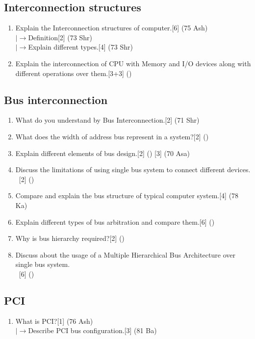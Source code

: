 \documentclass[12pt]{article}
\newcommand{\lb}{\\$\left|\rightarrow\right.$}
\newcommand{\enter}{\\\textcolor{white}{1}}
\begin{document}
	\subsection{Interconnection structures}
	\begin{enumerate}[noitemsep, topsep = 0pt]
	\item Explain the Interconnection structures of computer.\hfill[6] (75 Ash)\
	\lb Definition\hfill[2] (73 Shr)
	\lb Explain different types.\hfill[4] (73 Shr)
	\item Explain the interconnection of CPU with Memory and I/O devices along with different operations over them.\hfill[3+3] ()
	\end{enumerate}
	\subsection{Bus interconnection}
	\begin{enumerate}[noitemsep, topsep = 0pt]
	\item What do you understand by Bus Interconnection.\hfill[2] (71 Shr)
	\item What does the width of address bus represent in a system?\hfill[2] ()
	\item Explain different elements of bus design.\hfill[2] (\bo{\texttt{79 Bh}}) [3] (70 Asa)
	\item Discuss the limitations of using single bus system to connect different devices.
	\enter\hfill[2] (\bo{75 Ch, 72 Ch})
	\item Compare and explain the bus structure of typical computer system.\hfill[4] (78 Ka)
	\item Explain different types of bus arbitration and compare them.\hfill[6] ()
	\item Why is bus hierarchy required?\hfill[2] (\bo{71 Ch})
	\item Discuss about the usage of a Multiple Hierarchical Bus Architecture over single bus system.
	\enter\hfill[6] (\bo{\texttt{80 Bh}})
	\end{enumerate}
	\subsection{PCI}
	\begin{enumerate}[noitemsep, topsep = 0pt]
	\item What is PCI?\hfill[1] (76 Ash)
	\lb Describe PCI bus configuration.\hfill[3] (81 Ba)
	\end{enumerate}
\end{document}
